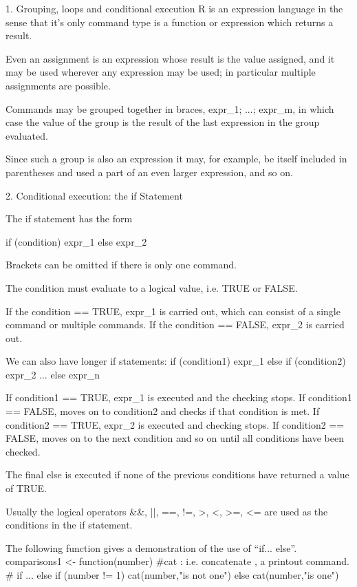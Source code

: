 1.	Grouping, loops and conditional execution
R is an expression language in the sense that it’s only command type is a function or expression which returns a result. 

Even an assignment is an expression whose result is the value assigned, and it may be used wherever any expression may be used; in particular multiple assignments are possible. 

Commands may be grouped together in braces, {expr_1; ...; expr_m}, in which case the value of the group is the result of the last expression in the group evaluated. 

Since such a group is also an expression it may, for example, be itself included in parentheses and used a part of an even larger expression, and so on.  


2.	Conditional execution: the if Statement

The if statement has the form 

if (condition)
      { expr_1 }
      else { expr_2 }

Brackets can be omitted if there is only one command. 

The condition must evaluate to a logical value, i.e. TRUE or FALSE. 

If the condition == TRUE, expr_1 is carried out, which can consist of a single command or multiple commands. If the condition == FALSE, expr_2 is carried out.

We can also have longer if statements:
if (condition1)
  {expr_1}
  else if (condition2)
     {expr_2}
     ...
     else {expr_n}

If condition1 == TRUE, expr_1 is executed and the checking 
stops. If condition1 == FALSE, moves on to condition2 and checks if that condition is met. 
If condition2 == TRUE, expr_2 is executed and checking stops. If condition2 == FALSE, moves on to the next condition and so on until all conditions have been checked.

The final else is executed if none of the previous conditions have returned a value of TRUE.

Usually the logical operators &&, ||, ==, !=, >, <, >=, <= are used
as the conditions in the if statement.

The following function gives a demonstration of the use of “if... else”.
comparisons1 <- function(number)
#cat :  i.e. concatenate ,  a printout command.
   {
   # if ... else
   if (number != 1)
       {
       cat(number,"is not one\n")
       }
    else
       {
       cat(number,"is one\n")
       }
    }



